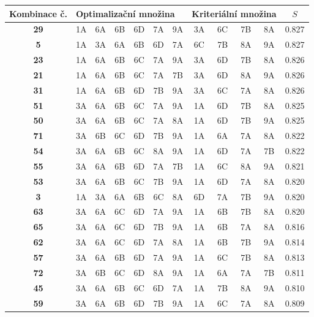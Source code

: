  
 \begin{table}
\centering
\begin{tabular}{|c||c|c|c|c|c|c||c|c|c|c||c|}
\hline
Kombinace č. &  \multicolumn{6}{l||}{Optimalizační množina} & \multicolumn{4}{l||}{Kriteriální množina} & $S$ \\
\hline \hline 
\textbf{29} & 1A & 6A & 6B & 6D & 7A & 9A & 3A & 6C & 7B & 8A & 0.827 \\
\hline
\textbf{5} & 1A & 3A & 6A & 6B & 6D & 7A & 6C & 7B & 8A & 9A & 0.827 \\
\hline
\textbf{23} & 1A & 6A & 6B & 6C & 7A & 9A & 3A & 6D & 7B & 8A & 0.826 \\
\hline
\textbf{21} & 1A & 6A & 6B & 6C & 7A & 7B & 3A & 6D & 8A & 9A & 0.826 \\
\hline
\textbf{31} & 1A & 6A & 6B & 6D & 7B & 9A & 3A & 6C & 7A & 8A & 0.826 \\
\hline
\textbf{51} & 3A & 6A & 6B & 6C & 7A & 9A & 1A & 6D & 7B & 8A & 0.825 \\
\hline
\textbf{50} & 3A & 6A & 6B & 6C & 7A & 8A & 1A & 6D & 7B & 9A & 0.825 \\
\hline
\textbf{71} & 3A & 6B & 6C & 6D & 7B & 9A & 1A & 6A & 7A & 8A & 0.822 \\
\hline
\textbf{54} & 3A & 6A & 6B & 6C & 8A & 9A & 1A & 6D & 7A & 7B & 0.822 \\
\hline
\textbf{55} & 3A & 6A & 6B & 6D & 7A & 7B & 1A & 6C & 8A & 9A & 0.821 \\
\hline
\textbf{53} & 3A & 6A & 6B & 6C & 7B & 9A & 1A & 6D & 7A & 8A & 0.820 \\
\hline
\textbf{3} & 1A & 3A & 6A & 6B & 6C & 8A & 6D & 7A & 7B & 9A & 0.820 \\
\hline
\textbf{63} & 3A & 6A & 6C & 6D & 7A & 9A & 1A & 6B & 7B & 8A & 0.820 \\
\hline
\textbf{65} & 3A & 6A & 6C & 6D & 7B & 9A & 1A & 6B & 7A & 8A & 0.816 \\
\hline
\textbf{62} & 3A & 6A & 6C & 6D & 7A & 8A & 1A & 6B & 7B & 9A & 0.814 \\
\hline
\textbf{57} & 3A & 6A & 6B & 6D & 7A & 9A & 1A & 6C & 7B & 8A & 0.813 \\
\hline
\textbf{72} & 3A & 6B & 6C & 6D & 8A & 9A & 1A & 6A & 7A & 7B & 0.811 \\
\hline
\textbf{45} & 3A & 6A & 6B & 6C & 6D & 7A & 1A & 7B & 8A & 9A & 0.810 \\
\hline
\textbf{59} & 3A & 6A & 6B & 6D & 7B & 9A & 1A & 6C & 7A & 8A & 0.809 \\

\end{tabular}
\end{table}

